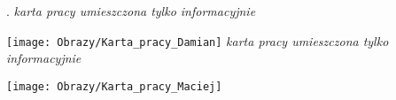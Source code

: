 \newpage
{\tiny .}
\thispagestyle{empty}
\setcounter{page}{0}
\newpage
\textit{karta pracy umieszczona tylko informacyjnie}

\texttt{[image: Obrazy/Karta\_pracy\_Damian]}
\newpage
\textit{karta pracy umieszczona tylko informacyjnie}

\texttt{[image: Obrazy/Karta\_pracy\_Maciej]}

